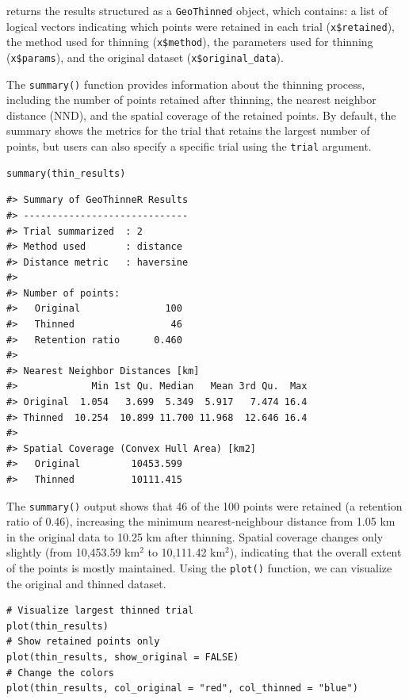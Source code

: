  returns the results structured as a \texttt{GeoThinned} object, which contains: a list of logical vectors indicating which points were retained in each trial (\texttt{x\$retained}), the method used for thinning (\texttt{x\$method}), the parameters used for thinning (\texttt{x\$params}), and the original dataset (\texttt{x\$original\_data}).

The \texttt{summary()} function provides information about the thinning process, including the number of points retained after thinning, the nearest neighbor distance (NND), and the spatial coverage of the retained points. By default, the summary shows the metrics for the trial that retains the largest number of points, but users can also specify a specific trial using the \texttt{trial} argument.

\begin{verbatim}
summary(thin_results)
\end{verbatim}

\begin{verbatim}
#> Summary of GeoThinneR Results
#> -----------------------------
#> Trial summarized  : 2 
#> Method used       : distance 
#> Distance metric   : haversine 
#> 
#> Number of points:
#>   Original               100
#>   Thinned                 46
#>   Retention ratio      0.460
#> 
#> Nearest Neighbor Distances [km]
#>             Min 1st Qu. Median   Mean 3rd Qu.  Max
#> Original  1.054   3.699  5.349  5.917   7.474 16.4
#> Thinned  10.254  10.899 11.700 11.968  12.646 16.4
#> 
#> Spatial Coverage (Convex Hull Area) [km2]
#>   Original         10453.599
#>   Thinned          10111.415
\end{verbatim}

The \texttt{summary()} output shows that 46 of the 100 points were retained (a retention ratio of 0.46), increasing the minimum nearest-neighbour distance from 1.05 km in the original data to 10.25 km after thinning. Spatial coverage changes only slightly (from 10,453.59 km\(^2\) to 10,111.42 km\(^2\)), indicating that the overall extent of the points is mostly maintained. Using the \texttt{plot()} function, we can visualize the original and thinned dataset.

\begin{verbatim}
# Visualize largest thinned trial
plot(thin_results)
# Show retained points only
plot(thin_results, show_original = FALSE)
# Change the colors
plot(thin_results, col_original = "red", col_thinned = "blue")
\end{verbatim}

